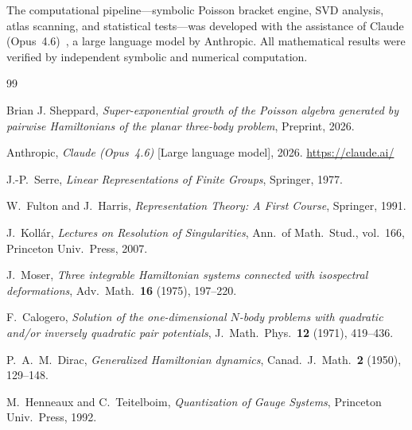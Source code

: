 \documentclass[11pt,a4paper]{article}
\theoremstyle{remark}
\begin{document}
The computational pipeline---symbolic Poisson bracket
engine, SVD analysis, atlas scanning, and statistical
tests---was developed with the assistance of Claude
(Opus~4.6)~\cite{claude-2026}, a large language model by
Anthropic.  All mathematical results were verified by
independent symbolic and numerical computation.


\begin{thebibliography}{99}

Brian J. Sheppard,
\emph{Super-exponential growth of the Poisson algebra
generated by pairwise Hamiltonians of the planar
three-body problem},
Preprint, 2026.

Anthropic,
\emph{Claude (Opus~4.6)} [Large language model], 2026.
\url{https://claude.ai/}

J.-P.~Serre,
\emph{Linear Representations of Finite Groups},
Springer, 1977.

W.~Fulton and J.~Harris,
\emph{Representation Theory: A First Course},
Springer, 1991.

J.~Koll\'{a}r,
\emph{Lectures on Resolution of Singularities},
Ann.\ of Math.\ Stud., vol.\ 166, Princeton Univ.\
Press, 2007.

J.~Moser,
\emph{Three integrable Hamiltonian systems connected with
isospectral deformations},
Adv.\ Math.\ \textbf{16} (1975), 197--220.

F.~Calogero,
\emph{Solution of the one-dimensional $N$-body problems
with quadratic and/or inversely quadratic pair potentials},
J.~Math.\ Phys.\ \textbf{12} (1971), 419--436.

P.~A.~M.~Dirac,
\emph{Generalized Hamiltonian dynamics},
Canad.\ J.~Math.\ \textbf{2} (1950), 129--148.

M.~Henneaux and C.~Teitelboim,
\emph{Quantization of Gauge Systems},
Princeton Univ.\ Press, 1992.

\end{thebibliography}
\end{document}
